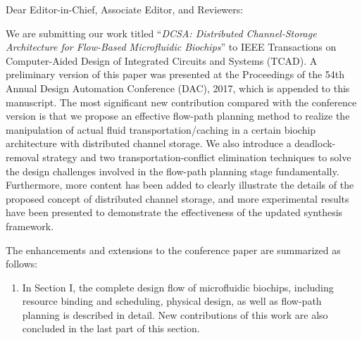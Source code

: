 \setcounter{page}{0}



\clearpage
\thispagestyle{empty}
\begin{table*}
\begin{center}
\begin{minipage}[t][21.5cm][t]{13.8cm}
\normalsize


\vspace{0pt}

Dear Editor-in-Chief, Associate Editor, and Reviewers:\\

\vspace{3pt}

We are submitting our work titled ``\textit{DCSA: Distributed Channel-Storage Architecture
for Flow-Based Microfluidic Biochips}'' to  IEEE Transactions on Computer-Aided Design of Integrated Circuits and Systems (TCAD). A preliminary version of this paper was presented at the Proceedings of the 54th Annual Design Automation Conference (DAC), 2017, which is appended to this manuscript. The most significant new contribution compared with the conference version is that we propose an effective flow-path planning method to realize the manipulation of actual fluid transportation/caching in a certain biochip architecture with distributed channel storage.
We also introduce a deadlock-removal strategy and two transportation-conflict elimination techniques to solve the design challenges involved in the flow-path planning stage fundamentally. Furthermore, more content has been added to clearly illustrate the details of the proposed concept of distributed channel storage, and more experimental results have been presented to demonstrate the effectiveness of the updated synthesis framework.

\vspace{10pt}

The enhancements and extensions to the conference paper are summarized as follows:

\vspace{3pt}

\begin{enumerate}

\item In Section I, the complete design flow of microfluidic biochips, including resource binding and scheduling, physical design, as well as flow-path planning is described in detail. New contributions of this work are also concluded in the last part of this section.


\end{enumerate}
\end{minipage}
\end{center}
\end{table*}
